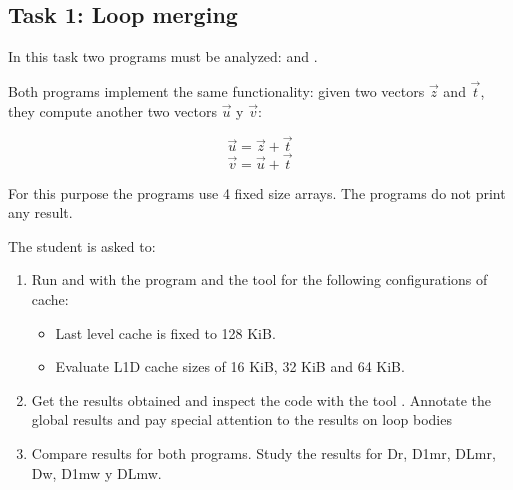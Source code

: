 \clearpage
\subsection{Task 1: Loop merging}

In this task two programs must be analyzed:  and
.





Both programs implement the same functionality: given two vectors $\vec{z}$ and
$\vec{t}$, they compute another two vectors $\vec{u}$ y $\vec{v}$:

\[
\vec{u} = \vec{z} + \vec{t}
\]
\[
\vec{v} = \vec{u} + \vec{t}
\]

For this purpose the programs use 4 fixed size arrays.  
The programs do not print any result.

The student is asked to: 

\begin{enumerate}

\item Run  and 
with the program  and
the tool  for the following configurations of cache:

\begin{itemize}
\item Last level cache is fixed to 128 KiB.
\item Evaluate L1D cache sizes of 16 KiB, 32 KiB and 64 KiB.
\end{itemize}

\item Get the results obtained and inspect the code with the tool
. Annotate the global results and pay special
attention to the results on loop bodies


\item Compare results for both programs. Study the results for
Dr, D1mr, DLmr, Dw, D1mw y DLmw. 
\end{enumerate}
